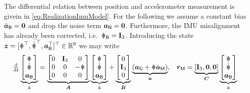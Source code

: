 The differential relation between position and accelerometer measurement is givein in \eqref{eq:RealizationImuModel}. 
For the following we assume a constant bias $\dot{\boldsymbol{a}}_{\mathsf{B}} = \boldsymbol{0}$ and drop the noise term $\boldsymbol{a}_{\mathsf{N}} = \boldsymbol{0}$.
Furthermore, the IMU misalignment has already been corrected, i.e.\ $\RIMUBR = \idMat[3]$.
Introducing the state $\tuple{z} = [\r^\top, \rd^\top, \aIMUB^\top]^\top \in \RealNum^9$ we may write 
\begin{align}\label{eq:AccelerometerDynamicsState}
 \tdiff{t}
 \underbrace{\begin{bmatrix} \r \\ \rd \\ \aIMUB \end{bmatrix}}_{\tuple{z}}
 &=
 \underbrace{\begin{bmatrix} 0 & \idMat[3] & 0 \\ 0 & 0 & -\R \\ 0 & 0 & 0 \end{bmatrix}}_{\mat{A}}
 \underbrace{\begin{bmatrix} \r \\ \rd \\ \aIMUB \end{bmatrix}}_{\tuple{z}}
 +
 \underbrace{\begin{bmatrix} 0 \\ \idMat[3] \\ 0 \end{bmatrix}}_{\mat{B}}
 \underbrace{(\gravityAcc + \R \aIMU)}_{\tuple{u}},&
 \rVIC &= \underbrace{[\idMat[3], \mat{0}, \mat{0}]}_{\mat{C}}
 \underbrace{\begin{bmatrix} \r \\ \rd \\ \aIMUB \end{bmatrix}}_{\tuple{z}}
\end{align}

